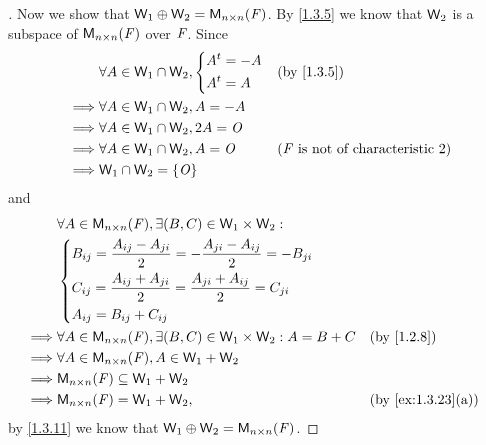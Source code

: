 \begin{proof}[]
  Now we show that \(\mathsf{W}_1 \oplus \mathsf{W}_2 = \mathsf{M}_{{n} \times n}({\mathit{F}})\).
  By \cref{1.3.5} we know that \(\mathsf{W}_2\) is a subspace of \(\mathsf{M}_{{n} \times n}({\mathit{F}})\) over \(\mathit{F}\).
  Since
  \begin{align*}
             & \forall A \in \W_1 \cap \W_2, \begin{dcases}
      \tp{A} = -A \\
      \tp{A} = A
    \end{dcases} &  & \text{(by \cref{1.3.5})}                       \\
    \implies & \forall A \in \W_1 \cap \W_2, A = -A                                                                         \\
    \implies & \forall A \in \W_1 \cap \W_2, 2A = \zm                                                                       \\
    \implies & \forall A \in \W_1 \cap \W_2, A = \zm                    &  & \text{(\(\F\) is not of characteristic \(2\))} \\
    \implies & \W_1 \cap \W_2 = \set{\zm}
  \end{align*}
  and
  \begin{align*}
             & \forall A \in \ms{n}{n}{\F}, \exists (B, C) \in \W_1 \times \W_2 :                                                \\
             & \begin{dcases}
      B_{i j} = \frac{A_{i j} - A_{j i}}{2} = - \frac{A_{j i} - A_{i j}}{2} = -B_{j i} \\
      C_{i j} = \frac{A_{i j} + A_{j i}}{2} = \frac{A_{j i} + A_{i j}}{2} = C_{j i}    \\
      A_{i j} = B_{i j} + C_{i j}
    \end{dcases}                                                                                        \\
    \implies & \forall A \in \ms{n}{n}{\F}, \exists (B, C) \in \W_1 \times \W_2 : A = B + C &  & \text{(by \cref{1.2.8})}        \\
    \implies & \forall A \in \ms{n}{n}{\F}, A \in \W_1 + \W_2                                                                    \\
    \implies & \ms{n}{n}{\F} \subseteq \W_1 + \W_2                                                                               \\
    \implies & \ms{n}{n}{\F} = \W_1 + \W_2,                                                 &  & \text{(by \cref{ex:1.3.23}(a))}
  \end{align*}
  by \cref{1.3.11} we know that \(\mathsf{W}_1 \oplus \mathsf{W}_2 = \mathsf{M}_{{n} \times n}({\mathit{F}})\).
\end{proof}

